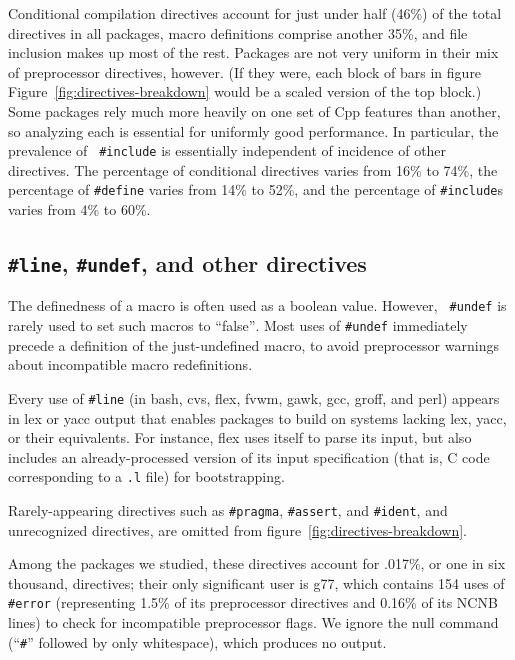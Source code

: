 \documentclass[10pt]{article}
\newcommand{\pkg}[1]{\textsf{#1}}
\begin{document}

Conditional compilation directives account for just under half (46\%) of
the total directives in all packages, macro definitions comprise another
35\%, and file inclusion makes up most of the rest.  Packages are not very
uniform in their mix of preprocessor directives, however.  (If they were,
each block of bars in figure Figure~\ref{fig:directives-breakdown} would be
a scaled version of the top block.)  Some packages rely much more heavily
on one set of Cpp features than another, so analyzing each is essential for
uniformly good performance.  In particular, the prevalence of {\tt
\#include} is essentially independent of incidence of other directives.
The percentage of conditional directives varies from 16\% to 74\%, the
percentage of {\tt \#define} varies from 14\% to 52\%, and the percentage
of {\tt \#include}s varies from 4\% to 60\%.


\subsection{{\tt \#line}, {\tt \#undef}, and other directives}

The definedness of a macro is often used as a boolean value.  However, {\tt
\#undef} is rarely used to set such macros to ``false''$\!$.  Most uses of
{\tt \#undef} immediately precede a definition of the just-undefined macro,
to avoid preprocessor warnings about incompatible macro redefinitions.

Every use of {\tt \#line} (in \pkg{bash}, \pkg{cvs}, \pkg{flex}, \pkg{fvwm},
\pkg{gawk}, \pkg{gcc}, \pkg{groff}, and \pkg{perl}) appears in lex or yacc
output that enables packages to build on systems lacking lex, yacc, or
their equivalents.  For instance, \pkg{flex} uses itself to parse its
input, but also includes an already-processed version of its input
specification (that is, C code corresponding to a {\tt .l} file) for
bootstrapping.


Rarely-appearing directives such as {\tt \#pragma}, {\tt \#assert}, and
{\tt \#ident}, and unrecognized directives, are omitted from
figure~\ref{fig:directives-breakdown}.

Among the packages we studied, these directives account for .017\%, or one
in six thousand, directives; their only significant user is \pkg{g77},
which contains 154 uses of {\tt \#error} (representing 1.5\% of its
preprocessor directives and 0.16\% of its NCNB lines) to check for
incompatible preprocessor flags.  We ignore the null command (``{\tt \#}''
followed by only whitespace), which produces no output.
\end{document}
